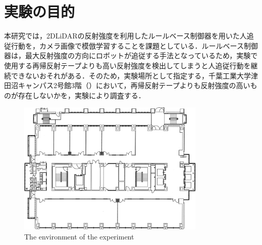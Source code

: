 
\section{実験の目的}

  本研究では，2DLiDARの反射強度を利用したルールベース制御器を用いた人追従行動を，カメラ画像で模倣学習することを課題としている．ルールベース制御器は，最大反射強度の方向にロボットが追従する手法となっているため，実験で使用する再帰反射テープよりも高い反射強度を検出してしまうと人追従行動を継続できないおそれがある．そのため，実験場所として指定する，千葉工業大学津田沼キャンパス2号館3階（）において，再帰反射テープよりも反射強度の高いものが存在しないかを，実験により調査する．

\vspace{1cm}

  \begin{figure}[h]
    \centering
    \includegraphics[width=9cm] {images/pdf/RobotGuidance_cit3f}
    \captionsetup{justification=raggedright} %
    \caption{The environment of the experiment}
    \label{Fig:RobotGuidance_cit3f}
  \end{figure}

\newpage